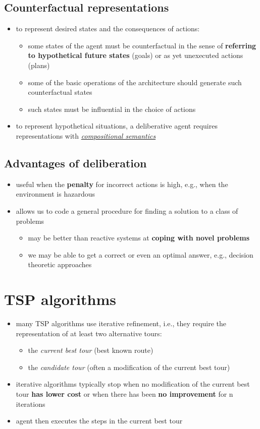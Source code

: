 \documentclass{article}
\newcommand{\worddef}[1]{\hyperref[sec:reference]{\textit{#1}}}
\begin{document}
\subsection{Counterfactual representations}
\begin{itemize}
  \item to represent desired states and the consequences of actions:
  \begin{itemize}
    \item some states of the agent must be counterfactual in the sense of \textbf{referring to hypothetical future states} (goals) or as yet unexecuted actions (plans)
    \item some of the basic operations of the architecture should generate such counterfactual states
    \item such states must be influential in the choice of actions
  \end{itemize}
  \item to represent hypothetical situations, a deliberative agent requires representations with \worddef{compositional semantics}
\end{itemize}

\subsection{Advantages of deliberation}
\begin{itemize}
  \item useful when the \textbf{penalty} for incorrect actions is high, e.g., when the environment is hazardous 
  \item allows us to code a general procedure for finding a solution to a class of problems
  \begin{itemize}
    \item may be better than reactive systems at \textbf{coping with novel problems}
    \item we may be able to get a correct or even an optimal answer, e.g., decision theoretic approaches
  \end{itemize}
\end{itemize}

\section{TSP algorithms}
\begin{itemize}
  \item many TSP algorithms use iterative refinement, i.e., they require the representation of at least two alternative tours:
  \begin{itemize}
    \item the \textit{current best tour} (best known route)
    \item the \textit{candidate tour} (often a modification of the current best tour)
  \end{itemize}
  \item iterative algorithms typically stop when no modification of the current best tour \textbf{has lower cost} or when there has been \textbf{no improvement} for n iterations 
  \item agent then executes the steps in the current best tour
\end{itemize}
\end{document}
